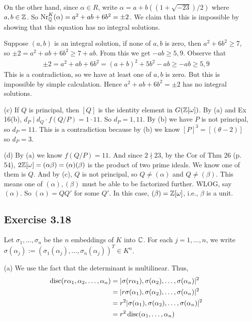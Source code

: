 \documentclass[../Marcus.tex]{subfiles}
\begin{document}
On the other hand, since $\alpha\in R$, write $\alpha=a+b((1+\sqrt{-23})/2)$ where $a,b\in\mathbb{Z}$. So $\operatorname{Nr}^K_{\mathbb{Q}}(\alpha)=a^2+ab+6b^2=\pm 2$. We claim that this is impossible by showing that this equation has no integral solutions.

Suppose $(a,b)$ is an integral solution, if none of $a,b$ is zero, then $a^2+6b^2\geq 7$, so $\pm2 = a^2+ab+6b^2 \geq 7+ab$. From this we get $-ab\geq 5,9$. Observe that
\begin{align*}
\pm2 = a^2+ab+6b^2 = (a+b)^2+5b^2-ab \geq -ab \geq 5,9
\end{align*}
This is a contradiction, so we have at least one of $a,b$ is zero. But this is impossible by simple calculation. Hence $a^2+ab+6b^2=\pm2$ has no integral solutions.

(c) If $Q$ is principal, then $[Q]$ is the identity element in $G(\mathbb{Z}[\omega])$. By (a) and Ex 16(b), $d_P\mid d_Q\cdot f(Q/P)=1\cdot 11$. So $d_P=1,11$. By (b) we have $P$ is not principal, so $d_P=11$. This is a contradiction because by (b) we know $[P]^3=[(\theta-2)]$ so $d_P=3$.

(d) By (a) we know $f(Q/P)=11$. And since $2\nmid 23$, by the Cor of Thm 26 (p. 54), $2\mathbb{Z}[\omega]=(\alpha\beta)=(\alpha)(\beta)$ is the product of two prime ideals. We know one of them is $Q$. And by (c), $Q$ is not principal, so $Q\neq (\alpha)$ and $Q\neq(\beta)$. This means one of $(\alpha),(\beta)$ must be able to be factorized further. WLOG, say $(\alpha)$. So $(\alpha)=QQ'$ for some $Q'$. In this case, $(\beta)=\mathbb{Z}[\omega]$, i.e., $\beta$ is a unit.

\subsection*{Exercise 3.18}

Let $\sigma_1,\ldots,\sigma_n$ be the $n$ embeddings of $K$ into $\mathbb{C}$. For each $j=1,\ldots,n$, we write $\sigma(\alpha_j):=(\sigma_1(\alpha_j),\ldots,\sigma_n(\alpha_j))^T\in K^n$.

(a) We use the fact that the determinant is multilinear. Thus,
\begin{align*}
\operatorname{disc}(r\alpha_1,\alpha_2,\ldots,\alpha_n) &= |\sigma(r\alpha_1),\sigma(\alpha_2),\ldots,\sigma(\alpha_n)|^2 \\
&= |r\sigma(\alpha_1),\sigma(\alpha_2),\ldots,\sigma(\alpha_n)|^2 \\
&= r^2|\sigma(\alpha_1),\sigma(\alpha_2),\ldots,\sigma(\alpha_n)|^2 \\
&= r^2\operatorname{disc}(\alpha_1,\ldots,\alpha_n)
\end{align*}
\end{document}
